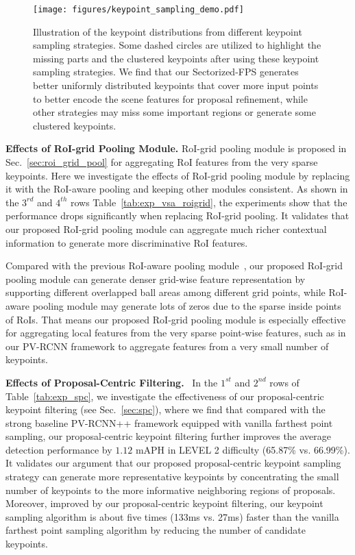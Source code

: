 \documentclass[natbib,twocolumn]{svjour3}          \smartqed  \usepackage{graphicx}
\begin{document}
\begin{figure*}
	\begin{center}
		\texttt{[image: figures/keypoint\_sampling\_demo.pdf]}
	\end{center}
	\vspace{-3.9mm}
	\caption{Illustration of the keypoint distributions from different keypoint sampling strategies. Some dashed circles are utilized to highlight the missing parts and the clustered keypoints after using these keypoint sampling strategies.
		We find that our Sectorized-FPS generates better uniformly distributed keypoints that cover more input points to better encode the scene features for proposal refinement, while other strategies may miss some important regions or generate some clustered keypoints.
	}
	\label{fig:spc}
\end{figure*}


\noindent
\textbf{Effects of RoI-grid Pooling Module.}
RoI-grid pooling module is proposed in Sec.~\ref{sec:roi_grid_pool} for aggregating RoI features from the very sparse keypoints.
Here we investigate the effects of RoI-grid pooling module by replacing it with the RoI-aware pooling \citep{shi2020part} and keeping other modules consistent. 
As shown in  the $3^{rd}$ and $4^{th}$ rows Table~\ref{tab:exp_vsa_roigrid}, 
the experiments 
show that the performance drops significantly when replacing RoI-grid pooling. It validates that our proposed RoI-grid pooling module can aggregate much richer contextual information to generate more discriminative RoI features.


Compared with the previous RoI-aware pooling module~\citep{shi2020part}, our proposed RoI-grid pooling module can generate denser grid-wise feature representation by supporting different overlapped ball areas among different grid points, while RoI-aware pooling module may generate lots of zeros due to the sparse inside points of RoIs. 
That means our proposed RoI-grid pooling module is especially effective for aggregating local features from the very sparse point-wise features, such as in our PV-RCNN framework to aggregate features from a very small number of keypoints. 


\noindent
\textbf{Effects of Proposal-Centric Filtering.}~ 
In the $1^{st}$ and $2^{nd}$ rows of Table~\ref{tab:exp_spc}, we investigate the effectiveness of our proposal-centric keypoint filtering (see Sec.~\ref{sec:spc}), 
where we find that compared with the strong baseline PV-RCNN++  framework equipped with vanilla farthest point sampling, our proposal-centric keypoint filtering further improves the average detection performance by $1.12$ mAPH in LEVEL 2 difficulty (65.87\% vs. 66.99\%).
It validates our argument that our proposed proposal-centric keypoint sampling strategy can generate more representative keypoints by concentrating the small number of keypoints to the more informative neighboring regions of proposals. Moreover, improved by our proposal-centric keypoint filtering, our keypoint sampling algorithm is about five times (133ms vs. 27ms) faster than the vanilla farthest point sampling algorithm by reducing the number of candidate keypoints. 
\end{document}
